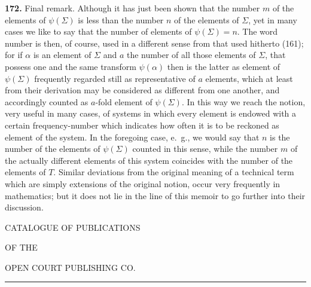 \documentclass[oneside]{book}
\newcommand\mypara{\medskip\textbf}
\begin{document}
\mypara{172.} Final remark. Although it has just been
shown that the number $m$ of the elements of $\psi(\Sigma)$ is
less than the number $n$ of the elements of $\Sigma$, yet in
many cases we like to say that the number of elements
of $\psi(\Sigma)=n$. The word number is then, of
course, used in a different sense from that used
hitherto (161); for if $\alpha$ is an element of $\Sigma$ and $a$ the
number of all those elements of $\Sigma$, that possess one
and the same transform $\psi(\alpha)$ then is the latter as element
of $\psi(\Sigma)$ frequently regarded still as representative
of $a$ elements, which at least from their derivation
may be considered as different from one another,
and accordingly counted as $a$-fold element of $\psi(\Sigma)$.
In this way we reach the notion, very useful in many
cases, of systems in which every element is endowed
with a certain frequency-number which indicates how
often it is to be reckoned as element of the system.
In the foregoing case, e.~g., we would say that $n$ is
the number of the elements of $\psi(\Sigma)$ counted in this
sense, while the number $m$ of the actually different
elements of this system coincides with the number of
the elements of $T$. Similar deviations from the original
meaning of a technical term which are simply extensions
of the original notion, occur very frequently
in mathematics; but it does not lie in the line of this
memoir to go further into their discussion.


\newpage
\pagestyle{empty}
\begin{center}
{\Large CATALOGUE OF PUBLICATIONS}

{\scriptsize OF THE}

{\large OPEN COURT PUBLISHING CO.}

\rule[.5ex]{3cm}{.2pt}
\end{center}
\end{document}

